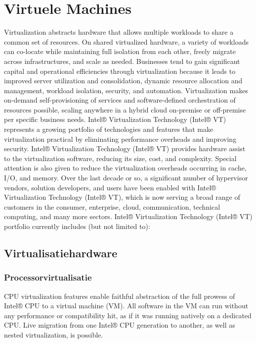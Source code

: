 \chapter{Virtuele Machines}


Virtualization abstracts hardware that allows multiple workloads to share a common set of resources. On shared virtualized hardware, a variety of workloads can co-locate while maintaining full isolation from each other, freely migrate across infrastructures, and scale as needed.
Businesses tend to gain significant capital and operational efficiencies through virtualization because it leads to improved server utilization and consolidation, dynamic resource allocation and management, workload isolation, security, and automation. Virtualization makes on-demand self-provisioning of services and software-defined orchestration of resources possible, scaling anywhere in a hybrid cloud on-premise or off-premise per specific business needs.
Intel® Virtualization Technology (Intel® VT) represents a growing portfolio of technologies and features that make virtualization practical by eliminating performance overheads and improving security. Intel® Virtualization Technology (Intel® VT) provides hardware assist to the virtualization software, reducing its size, cost, and complexity. Special attention is also given to reduce the virtualization overheads occurring in cache, I/O, and memory. Over the last decade or so, a significant number of hypervisor vendors, solution developers, and users have been enabled with Intel® Virtualization Technology
(Intel® VT), which is now serving a broad range of customers in the consumer, enterprise, cloud, communication, technical computing, and many more sectors.
Intel® Virtualization Technology (Intel® VT) portfolio currently includes (but not limited to):

\section{Virtualisatiehardware}

\subsection{Processorvirtualisatie}

CPU virtualization features enable faithful abstraction of the full prowess of Intel® CPU to a virtual machine (VM). All software in the VM can run without any performance or compatibility hit, as if it was running natively on a dedicated CPU. Live migration from one Intel® CPU generation to another, as well as nested virtualization, is possible.

